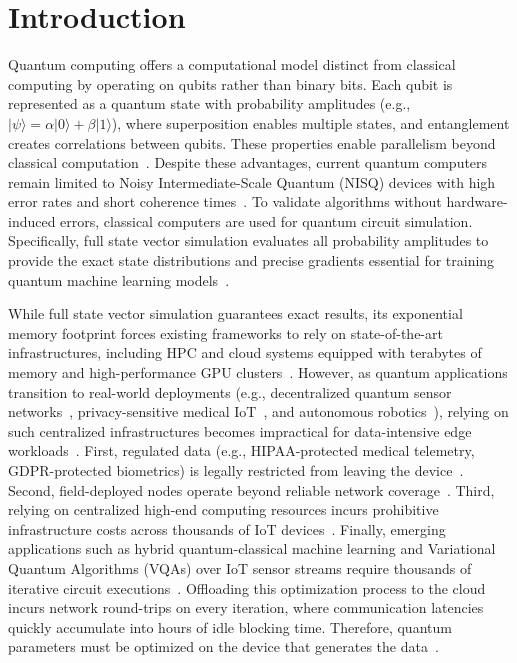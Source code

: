 \section{Introduction}
\label{sec:intro}


Quantum computing offers a computational model distinct from classical computing by operating on qubits rather than binary bits. Each qubit is represented as a quantum state with probability amplitudes (e.g., $|\psi\rangle = \alpha|0\rangle + \beta|1\rangle$), where superposition enables multiple states, and entanglement creates correlations between qubits. These properties enable parallelism beyond classical computation~\cite{renner2022computational, miguel2023enhancing}. Despite these advantages, current quantum computers remain limited to Noisy Intermediate-Scale Quantum (NISQ) devices with high error rates and short coherence times~\cite{lau2022nisq, saki2019study, preskill2018quantum}. To validate algorithms without hardware-induced errors, classical computers are used for quantum circuit simulation. Specifically, full state vector simulation evaluates all probability amplitudes to provide the exact state distributions and precise gradients essential for training quantum machine learning models~\cite{miller2025phase2, kim2023evidence, xu2025herculean}. 

While full state vector simulation guarantees exact results, its exponential memory footprint forces existing frameworks to rely on state-of-the-art infrastructures, including HPC and cloud systems equipped with terabytes of memory and high-performance GPU clusters~\cite{xu2024atlas, 10.1145/3771577, zhang2021hyquas}. However, as quantum applications transition to real-world deployments (e.g., decentralized quantum sensor networks~\cite{guo2020distributed}, privacy-sensitive medical IoT~\cite{barua2024data}, and autonomous robotics~\cite{skolik2022quantum}), relying on such centralized infrastructures becomes impractical for data-intensive edge workloads~\cite{fernandez2019pre, caro2022generalization}. First, regulated data (e.g., HIPAA-protected medical telemetry, GDPR-protected biometrics) is legally restricted from leaving the device~\cite{theodos2020health, khan2021federated}. Second, field-deployed nodes operate beyond reliable network coverage~\cite{wang2020convergence, lim2020federated}. Third, relying on centralized high-end computing resources incurs prohibitive infrastructure costs across thousands of IoT devices~\cite{xu2024iot, gill2019transformative}. Finally, emerging applications such as hybrid quantum-classical machine learning and Variational Quantum Algorithms (VQAs) over IoT sensor streams require thousands of iterative circuit executions~\cite{verma2025quantum, cerezo2021variational, mastroianni2024variational}. Offloading this optimization process to the cloud incurs network round-trips on every iteration, where communication latencies quickly accumulate into hours of idle blocking time. Therefore, quantum parameters must be optimized on the device that generates the data~\cite{zhang2025breaking, li2025infscaler}.


